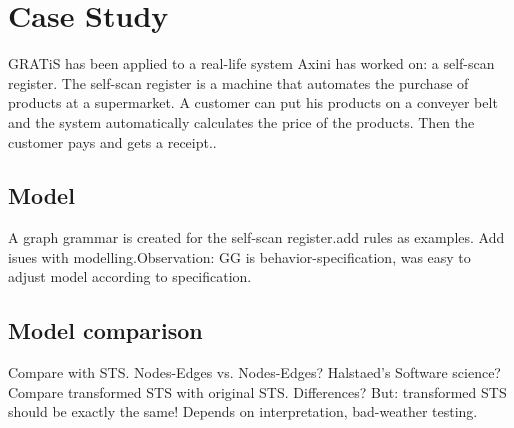 \section{Case Study}\label{sec:case-studies}

GRATiS has been applied to a real-life system Axini has worked on: a self-scan register. The self-scan register is a machine that automates the purchase of products at a supermarket. A customer can put his products on a conveyer belt and the system automatically calculates the price of the products. Then the customer pays and gets a receipt..

\subsection{Model}
A graph grammar is created for the self-scan register.add rules as examples. Add isues with modelling.Observation: GG is behavior-specification, was easy to adjust model according to specification. 

\subsection{Model comparison} 
Compare with STS. Nodes-Edges vs. Nodes-Edges? Halstaed's Software science? Compare transformed STS with original STS. Differences? But: transformed STS should be exactly the same! Depends on interpretation, bad-weather testing.

